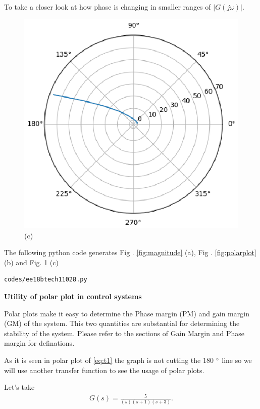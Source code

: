 \begin{enumerate}[label=\thesection.\arabic*.,ref=\thesection.\theenumi]
To take a closer look at how phase is changing in smaller ranges of $|G(j \omega)|$.
\begin{figure}[!h]
    \includegraphics[width=\columnwidth]{./figs/ee18btech11028/polar_plot2.eps}
  \caption{(c)}
  \label{fig:polarplot2}
\end{figure}

The following python code generates  Fig . \ref{fig:magnitude} (a), Fig . \ref{fig:polarplot} (b) and Fig. \ref{fig:polarplot2} (c)
\begin{lstlisting}
codes/ee18btech11028.py
\end{lstlisting}

\textbf{Utility of polar plot in control systems}

Polar plots make it easy to determine the Phase margin (PM) and gain margin (GM) of the system.
This two quantities are substantial for determining the stability of the system.
Please refer to the sections of Gain Margin and Phase margin for definations.

As it is seen in polar plot of \eqref{eq:t1} the graph is not cutting the 180 $\degree$ line so we will use another transfer function to see the usage of polar plots.

Let's take
\begin{align}
    G(s) = \frac{5}{(s)(s+1)(s+3)}.
    \label{eq:t2} 
\end{align}


\end{enumerate}
